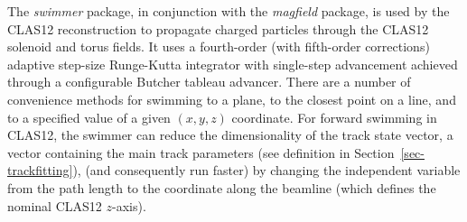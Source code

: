 The {\it swimmer} package, in conjunction with the {\it magfield} package, is used by the CLAS12 reconstruction
to propagate charged particles through the CLAS12 solenoid and torus fields. It uses a fourth-order (with
fifth-order corrections) adaptive step-size Runge-Kutta integrator with single-step advancement achieved through
a configurable Butcher tableau advancer. There are a number of convenience methods for swimming to a plane, to
the closest point on a line, and to a specified value of a given $(x,y,z)$ coordinate. For forward swimming in CLAS12,
the swimmer can reduce the dimensionality of the track state vector, a vector containing the main track parameters
(see definition in Section~\ref{sec-trackfitting}), (and consequently run faster) by changing the independent variable
from the path length to the coordinate along the beamline (which defines the nominal CLAS12 $z$-axis).
